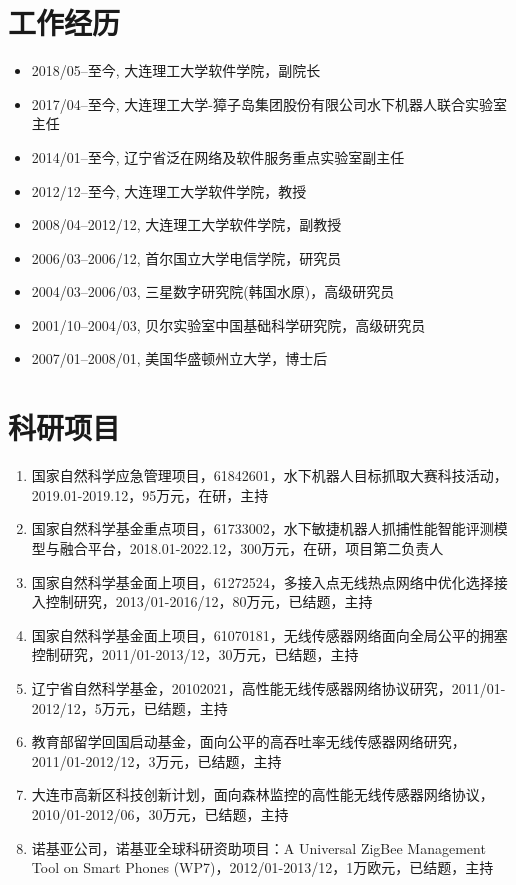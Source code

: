 \documentclass{resume}
\begin{document}

\section{工作经历}

  
\begin{itemize}
\item 2018/05--至今, 大连理工大学软件学院，副院长
\item 2017/04--至今, 大连理工大学-獐子岛集团股份有限公司水下机器人联合实验室主任
\item 2014/01--至今, 辽宁省泛在网络及软件服务重点实验室副主任
\item 2012/12--至今, 大连理工大学软件学院，教授
\item 2008/04--2012/12, 大连理工大学软件学院，副教授
\item 2006/03--2006/12, 首尔国立大学电信学院，研究员
\item 2004/03--2006/03, 三星数字研究院(韩国水原)，高级研究员
\item 2001/10--2004/03, 贝尔实验室中国基础科学研究院，高级研究员
\item 2007/01--2008/01, 美国华盛顿州立大学，博士后
\end{itemize}

\section{科研项目}
\begin{enumerate}[parsep=0.2ex]
\item 国家自然科学应急管理项目，61842601，水下机器人目标抓取大赛科技活动，2019.01-2019.12，95万元，在研，主持
\item 国家自然科学基金重点项目，61733002，水下敏捷机器人抓捕性能智能评测模型与融合平台，2018.01-2022.12，300万元，在研，项目第二负责人
\item 国家自然科学基金面上项目，61272524，多接入点无线热点网络中优化选择接入控制研究，2013/01-2016/12，80万元，已结题，主持
\item 国家自然科学基金面上项目，61070181，无线传感器网络面向全局公平的拥塞控制研究，2011/01-2013/12，30万元，已结题，主持
\item 辽宁省自然科学基金，20102021，高性能无线传感器网络协议研究，2011/01-2012/12，5万元，已结题，主持
\item 教育部留学回国启动基金，面向公平的高吞吐率无线传感器网络研究，2011/01-2012/12，3万元，已结题，主持
\item 大连市高新区科技创新计划，面向森林监控的高性能无线传感器网络协议， 2010/01-2012/06，30万元，已结题，主持
\item 诺基亚公司，诺基亚全球科研资助项目：A Universal ZigBee Management Tool on Smart Phones (WP7)，2012/01-2013/12，1万欧元，已结题，主持
\end{enumerate}
\end{document}
